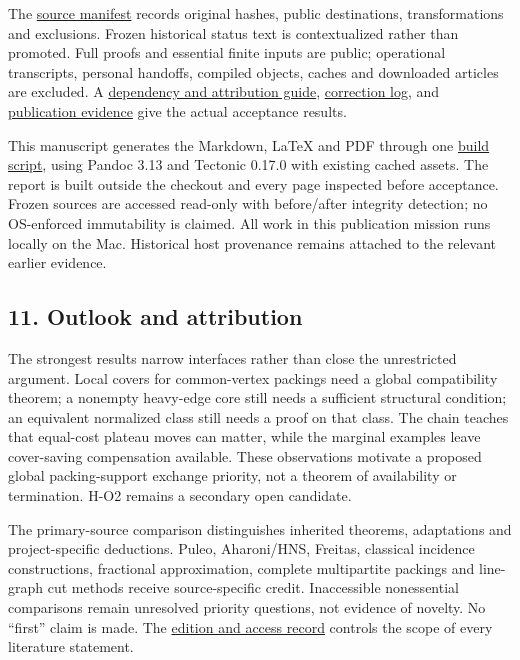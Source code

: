 \documentclass[11pt,a4paper]{article}
\begin{document}
The \href{https://github.com/pappa211/ai-math-experiments/blob/main/problems/TUZA-16-19-SOURCE_MANIFEST.json}{source manifest} records original hashes, public destinations, transformations and exclusions. Frozen historical status text is contextualized rather than promoted. Full proofs and essential finite inputs are public; operational transcripts, personal handoffs, compiled objects, caches and downloaded articles are excluded. A \href{https://github.com/pappa211/ai-math-experiments/blob/main/verification/tuza-16-19/DEPENDENCIES.md}{dependency and attribution guide}, \href{https://github.com/pappa211/ai-math-experiments/blob/main/verification/tuza-16-19/CORRECTIONS.md}{correction log}, and \href{https://github.com/pappa211/ai-math-experiments/blob/main/verification/tuza-16-19/README.md}{publication evidence} give the actual acceptance results.

This manuscript generates the Markdown, LaTeX and PDF through one \href{https://github.com/pappa211/ai-math-experiments/blob/main/papers/tuza-16-19-research-summary/README.md}{build script}, using Pandoc 3.13 and Tectonic 0.17.0 with existing cached assets. The report is built outside the checkout and every page inspected before acceptance. Frozen sources are accessed read-only with before/after integrity detection; no OS-enforced immutability is claimed. All work in this publication mission runs locally on the Mac. Historical host provenance remains attached to the relevant earlier evidence.

\subsection{11. Outlook and attribution}\label{outlook-and-attribution}

The strongest results narrow interfaces rather than close the unrestricted argument. Local covers for common-vertex packings need a global compatibility theorem; a nonempty heavy-edge core still needs a sufficient structural condition; an equivalent normalized class still needs a proof on that class. The chain teaches that equal-cost plateau moves can matter, while the marginal examples leave cover-saving compensation available. These observations motivate a proposed global packing-support exchange priority, not a theorem of availability or termination. H-O2 remains a secondary open candidate.

The primary-source comparison distinguishes inherited theorems, adaptations and project-specific deductions. Puleo, Aharoni/HNS, Freitas, classical incidence constructions, fractional approximation, complete multipartite packings and line-graph cut methods receive source-specific credit. Inaccessible nonessential comparisons remain unresolved priority questions, not evidence of novelty. No ``first'' claim is made. The \href{https://github.com/pappa211/ai-math-experiments/blob/main/papers/tuza-16-19-research-summary/LITERATURE_RECHECK.md}{edition and access record} controls the scope of every literature statement.
\end{document}
